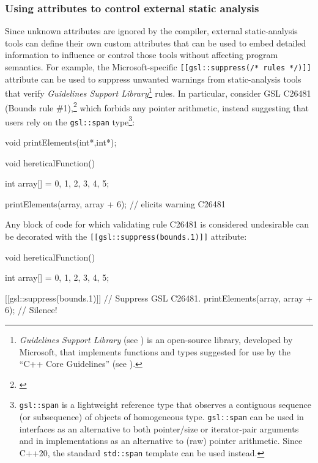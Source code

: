 \subsubsection[Using attributes to control external static analysis]{Using attributes to control external static analysis}\label{using-attributes-to-control-external-static-analysis}

Since unknown attributes are ignored by the compiler, external
static-analysis tools can define their own custom attributes that can be
used to embed detailed information to influence or control those tools
without affecting program semantics. For example, the Microsoft-specific
\lstinline![[gsl::suppress(/*!~\lstinline!rules!~\lstinline!*/)]]! attribute can
be used to suppress unwanted warnings from static-analysis tools that
verify \emph{Guidelines Support Library}{\cprotect\footnote{\emph{Guidelines
Support Library} (see \cite{microsoft}) is an open-source library, developed by Microsoft,
that implements functions and types suggested for use by the ``C++
  Core Guidelines'' (see \cite{stroustrup20}).}}
rules. In particular, consider GSL C26481 (Bounds rule \#1),\footnote{\cite{microsoftC26481}} which forbids any pointer arithmetic, instead
suggesting that users rely on the \lstinline!gsl::span!
type{\cprotect\footnote{\lstinline!gsl::span! is a lightweight reference
type that observes a contiguous sequence (or subsequence) of objects
of homogeneous type. \lstinline!gsl::span! can be used in interfaces as
an alternative to both pointer/size or iterator-pair arguments and in
implementations as an alternative to (raw) pointer arithmetic. Since
  C++20, the standard \lstinline!std::span! template can be used instead.}}:

\begin{emcppshiddenlisting}[emcppsbatch={e9,e10}]
void printElements(int*,int*);
\end{emcppshiddenlisting}
\begin{emcppslisting}[emcppsbatch=e9]
void hereticalFunction()
{
    int array[] = {0, 1, 2, 3, 4, 5};

    printElements(array, array + 6);  // elicits warning C26481
}
\end{emcppslisting}

\noindent Any block of code for which validating rule C26481 is considered
undesirable can be decorated with the
\lstinline![[gsl::suppress(bounds.1)]]! attribute:\pagebreak%

\begin{emcppslisting}[emcppsbatch=e10,emcppserrorlines=5]
void hereticalFunction()
{
    int array[] = {0, 1, 2, 3, 4, 5};

    [[gsl::suppress(bounds.1)]]           // Suppress GSL C26481.
    {
        printElements(array, array + 6);  // Silence!
    }
}
\end{emcppslisting}


